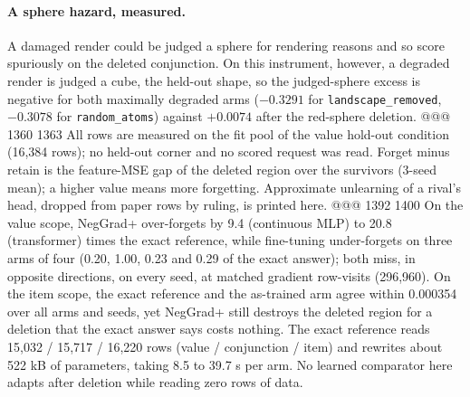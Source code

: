 \paragraph{A sphere hazard, measured.} A damaged render could be judged a sphere for rendering
reasons and so score spuriously on the deleted conjunction. On this instrument, however, a
degraded render is judged a cube, the held-out shape, so the judged-sphere excess is negative for
both maximally degraded arms ($-0.3291$ for \texttt{landscape\_removed}, $-0.3078$ for
\texttt{random\_atoms}) against $+0.0074$ after the red-sphere deletion.
@@@ 1360 1363
All rows are measured on the fit pool of the value hold-out condition (16,384 rows); no held-out corner %
and no scored request was read. Forget minus retain is the feature-MSE gap of the deleted region
over the survivors (3-seed mean); a higher value means more forgetting. Approximate unlearning of a
rival's head, dropped from paper rows by ruling, is printed here.
@@@ 1392 1400
\noindent On the value scope, NegGrad+ over-forgets by 9.4 (continuous MLP) to 20.8 (transformer)
times the exact reference, while fine-tuning under-forgets on three arms of four (0.20, 1.00, 0.23
and 0.29 of the exact answer); both miss, in opposite directions, on every seed, at matched gradient
row-visits (296,960). On the item scope, the exact reference and the as-trained arm agree within
0.000354 over all arms and seeds, yet NegGrad+ still destroys the deleted region for a deletion
that the exact answer says costs nothing. The exact reference reads 15,032 / 15,717 / 16,220 rows
(value / conjunction / item) and rewrites about 522 kB of parameters, taking 8.5 to 39.7 s per
arm. No learned comparator here adapts after deletion while reading zero rows of data.
